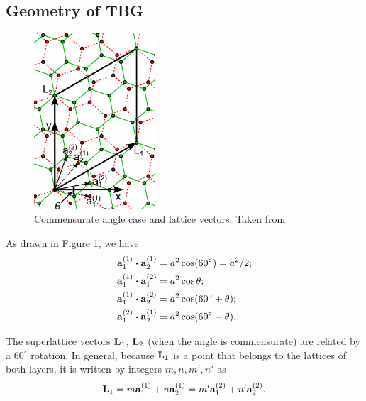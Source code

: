 \documentclass[12pt]{report}
\begin{document}
\subsection{Geometry of TBG} \label{sec:tbg_geom}

\begin{figure}[H]
\centering
\includegraphics[width=0.4\textwidth]{fig/tbg/latvec.png}
\caption{Commensurate angle case and lattice vectors. Taken from \cite{koshino2012}}
\label{fig:latvec}
\end{figure}

As drawn in Figure \ref{fig:latvec}, we have
\begin{align}
\label{eq:scalarprods1}
\vb{a}_1^{(1)} \vdot \vb{a}_2^{(1)} &= a^2 \cos(60^\circ) = a^2/2; \\
\label{eq:scalarprods2}
\vb{a}_1^{(1)} \vdot \vb{a}_1^{(2)} &= a^2 \cos\theta; \\
\label{eq:scalarprods3}
\vb{a}_1^{(1)} \vdot \vb{a}_2^{(2)} &= a^2 \cos(60^\circ + \theta); \\
\label{eq:scalarprods4}
\vb{a}_1^{(2)} \vdot \vb{a}_2^{(1)} &= a^2 \cos(60^\circ - \theta).
\end{align}

The superlattice vectors $\vb{L}_1$, $\vb{L}_2$ (when the angle is commensurate) are related by a $60^\circ$ rotation. In general, because $\vb{L}_1$ is a point that belongs to the lattices of both layers, it is written by integers $m,n,m',n'$ as
\begin{equation} \label{eq:L1}
\vb{L}_1 = m\vb{a}_1^{(1)} + n\vb{a}_2^{(1)} = m'\vb{a}_1^{(2)} + n'\vb{a}_2^{(2)}.
\end{equation}
\end{document}
